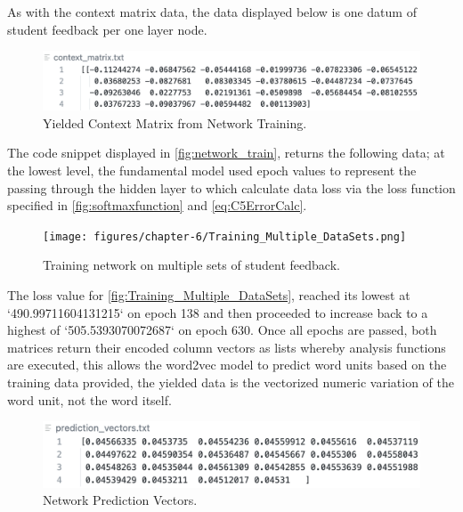 As with the context matrix data, the data displayed below is one datum of student feedback per one layer node.

\begin{figure}[H]
    \centering
    \includegraphics[width=\textwidth]{figures/chapter-6/ContextMatrix.png}
    \caption[Yielded Context Matrix]{Yielded Context Matrix from Network Training.
    \label{fig:sample_context_matrix}}
\end{figure}

The code snippet displayed in \autoref{fig:network_train}, returns the following data; at the lowest level, the fundamental model used epoch values to represent the passing through the hidden layer to which calculate data loss via the loss function specified in \autoref{fig:softmaxfunction} and \autoref{eq:C5ErrorCalc}.

\begin{figure}[H]
    \centering
    \texttt{[image: figures/chapter-6/Training\_Multiple\_DataSets.png]}
    \caption[Training network on multiple sets of student feedback]{Training network on multiple sets of student feedback.
    \label{fig:Training_Multiple_DataSets}}
\end{figure}

The loss value for \autoref{fig:Training_Multiple_DataSets}, reached its lowest at `490.99711604131215` on epoch 138 and then proceeded to increase back to a highest of `505.5393070072687` on epoch 630. Once all epochs are passed, both matrices return their encoded column vectors as lists whereby analysis functions are executed, this allows the word2vec model to predict word units based on the training data provided, the yielded data is the vectorized numeric variation of the word unit, not the word itself.

\begin{figure}[H]
    \centering
    \includegraphics[width=\textwidth]{figures/chapter-6/prediction_vectors.png}
    \caption[Network Prediction Vectors]{Network Prediction Vectors.
    \label{fig:prediction_vectors}}
\end{figure}

